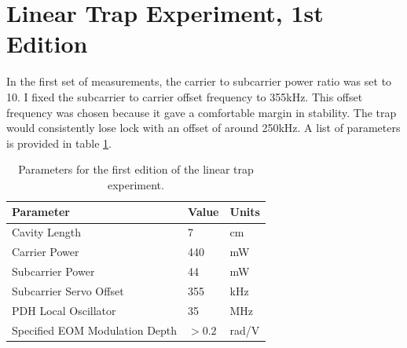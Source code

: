 %

\section{Linear Trap Experiment, 1st Edition}


In the first set of measurements, the carrier to subcarrier power ratio was
set to 10.
I fixed the subcarrier to carrier offset frequency to 355kHz.
This offset frequency was chosen because it gave a comfortable margin
in stability.
The trap would consistently lose lock with an offset of around
250kHz.
A list of parameters is provided in table \ref{tab:trapparams1}.

\begin{table}
  \begin{center}
    \begin{tabular}{|l|l|l|}
      \hline
      Parameter & Value & Units \\
      \hline
      \hline
      Cavity Length & 7 & cm \\
      Carrier Power & 440 & mW \\
      Subcarrier Power & 44 & mW \\
      Subcarrier Servo Offset & 355 & kHz \\
      PDH Local Oscillator & 35 & MHz \\
      Specified EOM Modulation Depth & $>0.2$ & rad/V \\
      \hline
    \end{tabular}
  \end{center}
  \caption[Parameters for Linear Trap Experiment, 1st Edition]{
      Parameters for the first edition of the linear trap experiment.
      }
  \label{tab:trapparams1}
\end{table}


